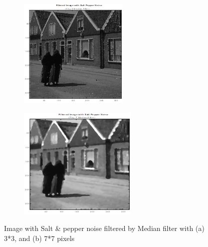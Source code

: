 \begin{figure}
    \centering
    \begin{subfigure}{0.4\textwidth}
        \includegraphics[width=\textwidth]{Resources/F9-a.png}
        \caption{}
        \label{fig:first}
    \end{subfigure}
    \hfill
    \begin{subfigure}{0.4\textwidth}
        \includegraphics[width=\textwidth]{Resources/F9-b.png}
        \caption{}
        \label{fig:Second}
    \end{subfigure}
    \caption{Image with Salt \& pepper noise filtered by Median filter with (a) 3*3, and (b) 7*7 pixels}
    \label{fig:ApplyingFilters}
\end{figure}